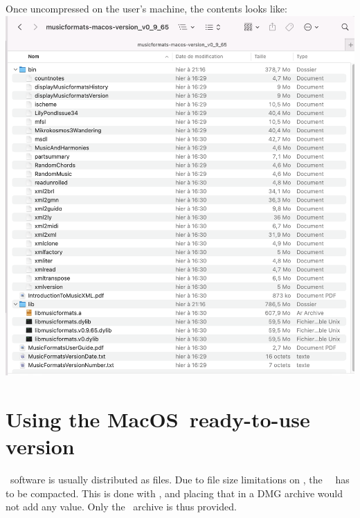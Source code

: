 Once uncompressed on the user's machine, the contents looks like:\\
\includegraphics[scale=0.5]{../mfgraphics/mfgraphicsReadyToUseVersionContentsExample.png}


\section{Using the MacOS\texttrademark\ ready-to-use version}

\MacOS\ software is usually distributed as  files. Due to file size limitations on \github, the \MacOS\ \readyToUseVersion\ has to be compacted. This is done with \zip, and placing that in a DMG archive would not add any value. Only the \zip\ archive is thus provided.


